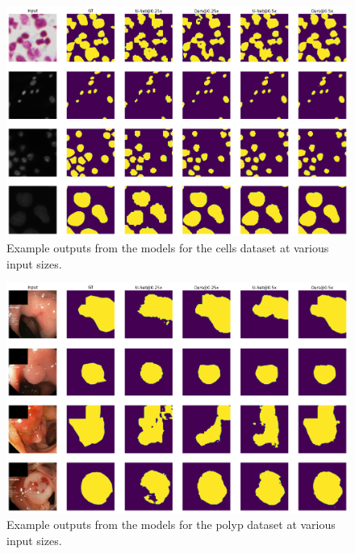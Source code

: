 \begin{figure}[b!]
	\includegraphics[width=\textwidth]{images/5/output_examples_cells.png}
	\caption{Example outputs from the models for the cells dataset at various input sizes. \cite{bencevicSegmentthenSegmentContextPreservingCropBased2023a}\label{fig:examples-cells}}
\end{figure}

\begin{figure}[t!]
	\includegraphics[width=\textwidth]{images/5/output_examples_polyp.png}
	\caption{Example outputs from the models for the polyp dataset at various input sizes. \cite{bencevicSegmentthenSegmentContextPreservingCropBased2023a}\label{fig:examples-polyp}}
\end{figure}

